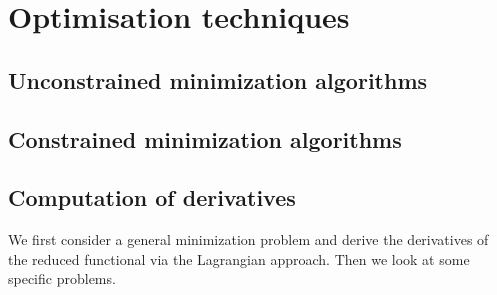 %
\section{Optimisation techniques}\label{sec:OptimisationTechniques}
%
%
\subsection{Unconstrained minimization algorithms}\label{subsec:}
%
%
\subsection{Constrained minimization algorithms}\label{subsec:}
%

%
\subsection{Computation of derivatives}\label{subsec:OT_ComputationOfDerivatives}
%
We first consider a general minimization problem and derive the derivatives of the reduced functional 
via the Lagrangian approach.
Then we look at some specific problems.
%
